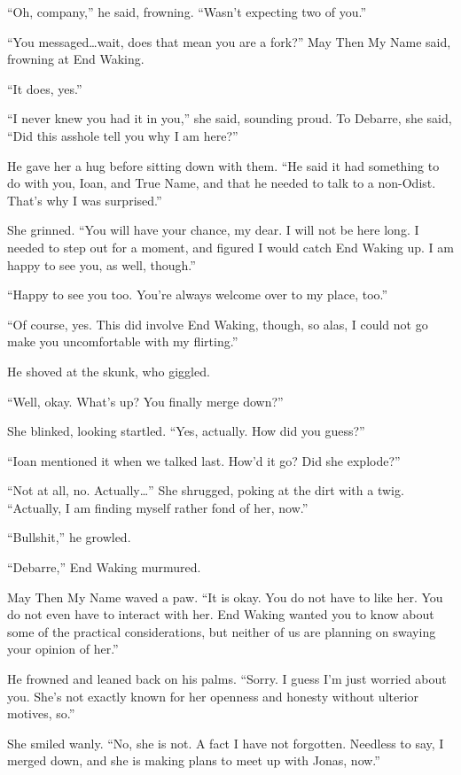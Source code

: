 ``Oh, company,'' he said, frowning. ``Wasn't expecting two of you.''

``You messaged\ldots wait, does that mean you are a fork?'' May Then My Name said, frowning at End Waking.

``It does, yes.''

``I never knew you had it in you,'' she said, sounding proud. To Debarre, she said, ``Did this asshole tell you why I am here?''

He gave her a hug before sitting down with them. ``He said it had something to do with you, Ioan, and True Name, and that he needed to talk to a non-Odist. That's why I was surprised.''

She grinned. ``You will have your chance, my dear. I will not be here long. I needed to step out for a moment, and figured I would catch End Waking up. I am happy to see you, as well, though.''

``Happy to see you too. You're always welcome over to my place, too.''

``Of course, yes. This did involve End Waking, though, so alas, I could not go make you uncomfortable with my flirting.''

He shoved at the skunk, who giggled.

``Well, okay. What's up? You finally merge down?''

She blinked, looking startled. ``Yes, actually. How did you guess?''

``Ioan mentioned it when we talked last. How'd it go? Did she explode?''

``Not at all, no. Actually\ldots{}'' She shrugged, poking at the dirt with a twig. ``Actually, I am finding myself rather fond of her, now.''

``Bullshit,'' he growled.

``Debarre,'' End Waking murmured.

May Then My Name waved a paw. ``It is okay. You do not have to like her. You do not even have to interact with her. End Waking wanted you to know about some of the practical considerations, but neither of us are planning on swaying your opinion of her.''

He frowned and leaned back on his palms. ``Sorry. I guess I'm just worried about you. She's not exactly known for her openness and honesty without ulterior motives, so.''

She smiled wanly. ``No, she is not. A fact I have not forgotten. Needless to say, I merged down, and she is making plans to meet up with Jonas, now.''

